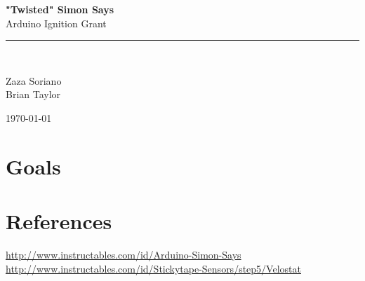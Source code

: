 \documentclass[12pt,letterpaper,oneside]{article}
\newcommand{\HRule}{\rule{\linewidth}{0.5mm}}
\begin{document}
\begin{titlepage}
\vspace*{\fill}
\begin{center}
	
{\huge \bfseries "Twisted" Simon Says} \\[0.4cm]
Arduino Ignition Grant
\HRule \\[0.4cm]

\begin{minipage}{\textwidth}
\center
Zaza Soriano\\
Brian Taylor
\end{minipage}

\vspace*{\fill}

{\large \today}
\end{center}
\end{titlepage}

\doublespace
\tableofcontents %
\newpage
\listoftables %
\newpage
\lstlistoflistings %
\newpage
\singlespace
{} %
			
\section{Goals}

\section{References}
\url{http://www.instructables.com/id/Arduino-Simon-Says}\\
\url{http://www.instructables.com/id/Stickytape-Sensors/step5/Velostat}
\end{document}
